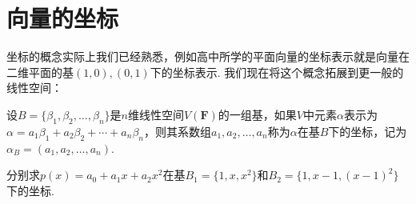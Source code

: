 \section{向量的坐标}

坐标的概念实际上我们已经熟悉，例如高中所学的平面向量的坐标表示就是向量在二维平面的基$(1,0),(0,1)$下的坐标表示. 我们现在将这个概念拓展到更一般的线性空间：
\begin{definition}{}{}
    设$B=\{\beta_1,\beta_2,\ldots,\beta_n\}$是$n$维线性空间$V(\mathbf{F})$的一组基，如果$V$中元素$\alpha$表示为$\alpha=a_1\beta_1+a_2\beta_2+\cdots+a_n\beta_n$，则其系数组$a_1,a_2,\ldots,a_n$称为$\alpha$在基$B$下的坐标，记为$\alpha_B=(a_1,a_2,\ldots,a_n)$.
\end{definition}

\begin{example}{}{}
    分别求$p(x)=a_0+a_1x+a_2x^2$在基$B_1=\{1,x,x^2\}$和$B_2=\{1,x-1,(x-1)^2\}$下的坐标.
\end{example}

